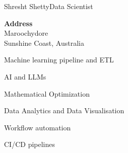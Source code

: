 \documentclass{article}
\begin{document}
\begin{cv}{Shresht Shetty}{Data Scientist}
\cvseparator[3]

\begin{cvitem}[Home][4]

    \textbf{Address}\\

    Maroochydore\\ Sunshine Coast, Australia

\end{cvitem}






\begin{cvitem}

    Machine learning pipeline and ETL

\end{cvitem}



\cvseparator

\begin{cvitem}

    AI and LLMs

\end{cvitem}



\cvseparator

\begin{cvitem}

    Mathematical Optimization

\end{cvitem}



\cvseparator

\begin{cvitem}

    Data Analytics and Data Visualisation

\end{cvitem}



\cvseparator

\begin{cvitem}

    Workflow automation

\end{cvitem}



\cvseparator

\begin{cvitem}

    CI/CD pipelines

\end{cvitem}













\end{cv}
\end{document}
